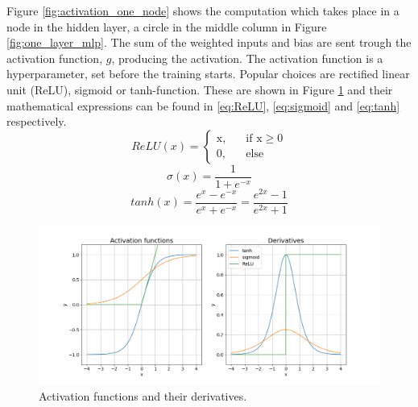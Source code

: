 Figure \ref{fig:activation_one_node} shows the computation which takes place in a node in the hidden layer, a circle in the middle column in Figure \ref{fig:one_layer_mlp}. The sum of the weighted inputs and bias are sent trough the activation function, $g$, producing the activation. The activation function is a hyperparameter, set before the training starts. Popular choices are rectified linear unit (ReLU), sigmoid or tanh-function. These are shown in Figure \ref{fig:activation_function_example} and their mathematical expressions can be found in \eqref{eq:ReLU}, \eqref{eq:sigmoid} and \eqref{eq:tanh} respectively.
\begin{equation} \label{eq:ReLU}
    ReLU\left(x\right) = 
     \begin{cases}
       \text{x,} &\quad\text{if x} \ge 0\\
       \text{0,} &\quad\text{else}
     \end{cases}
\end{equation}
\begin{equation} \label{eq:sigmoid}
    \sigma \left( x \right) = \frac{1}{1 + e^{-x}}
\end{equation}
\begin{equation} \label{eq:tanh}
    tanh\left( x \right) = \frac{e^x - e^{-x}}{e^x + e^{-x}} = \frac{e^{2x} - 1}{e^{2x} + 1}
\end{equation}
\begin{figure}
    \centering
    \includegraphics[scale = 0.4]{Chapter3_Method/figs/activation_functions_and_derivatives.png}
    \caption{Activation functions and their derivatives.}
    \label{fig:activation_function_example}
\end{figure}
